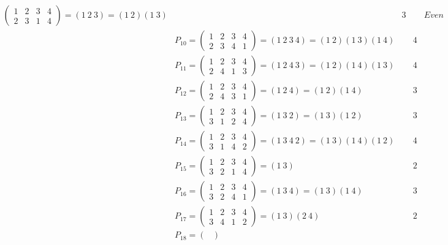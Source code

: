 \documentclass{article}
\begin{document}
\begin{align*}
\begin{pmatrix}
    1 & 2 & 3 & 4 \\
    2 & 3 & 1 & 4
  \end{pmatrix} = (1 \ 2 \ 3) = (1 \ 2) (1 \ 3) &&3 &&Even
  \\
  &P_{10} = \begin{pmatrix}
    1 & 2 & 3 & 4 \\
    2 & 3 & 4 & 1
  \end{pmatrix} = (1 \ 2 \ 3 \ 4) = (1 \ 2) (1 \ 3) (1 \ 4) &&4 &&Odd
  \\
  &P_{11} = \begin{pmatrix}
    1 & 2 & 3 & 4 \\
    2 & 4 & 1 & 3
  \end{pmatrix} = (1 \ 2 \ 4 \ 3) = (1 \ 2) (1 \ 4) (1 \ 3) &&4 &&Odd
  \\
  &P_{12} = \begin{pmatrix}
    1 & 2 & 3 & 4 \\
    2 & 4 & 3 & 1
  \end{pmatrix} = (1 \ 2 \ 4) = (1 \ 2) (1 \ 4) &&3 &&Even
  \\
  &P_{13} = \begin{pmatrix}
    1 & 2 & 3 & 4 \\
    3 & 1 & 2 & 4
  \end{pmatrix} = (1 \ 3 \ 2) = (1 \ 3) (1 \ 2) &&3 &&Even
  \\
  &P_{14} = \begin{pmatrix}
    1 & 2 & 3 & 4 \\
    3 & 1 & 4 & 2
  \end{pmatrix} = (1 \ 3 \ 4 \ 2) = (1 \ 3) (1 \ 4) (1 \ 2) &&4 &&Odd
  \\
  &P_{15} = \begin{pmatrix}
    1 & 2 & 3 & 4 \\
    3 & 2 & 1 & 4
  \end{pmatrix} = (1 \ 3) &&2 &&Odd
  \\
  &P_{16} = \begin{pmatrix}
    1 & 2 & 3 & 4 \\
    3 & 2 & 4 & 1
  \end{pmatrix} = (1 \ 3 \ 4) = (1 \ 3) (1 \ 4) &&3 &&Even
  \\
  &P_{17} = \begin{pmatrix}
    1 & 2 & 3 & 4 \\
    3 & 4 & 1 & 2
  \end{pmatrix} = (1 \ 3) (2 \ 4) &&2 &&Even
  \\
  &P_{18} = \begin{pmatrix}

\end{pmatrix}
\end{align*}
\end{document}
